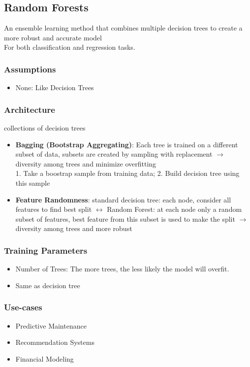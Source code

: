\documentclass[english, threecolumn]{latex4ei/latex4ei_sheet}
\begin{document}
\begin{sectionbox}
\subsection{Random Forests}
An ensemble learning method that combines multiple decision trees to create a more robust and accurate model\\
For both classification and regression tasks.

\subsubsection{Assumptions}
\begin{itemize}
    \item None: Like Decision Trees
\end{itemize}

\subsubsection{Architecture}
collections of decision trees
\begin{itemize}
    \item \textbf{Bagging (Bootstrap Aggregating)}: Each tree is trained on a different subset of data, subsets are created by sampling with replacement $\rightarrow$ diversity among trees and minimize overfitting\\
    1. Take a boostrap sample from training data; 2. Build decision tree using this sample
    \item \textbf{Feature Randomness}: standard decision tree: each node, consider all features to find best split $\leftrightarrow$ Random Forest: at each node only a random subset of features, best feature from this subset is used to make the split $\rightarrow$ diversity among trees and more robust
\end{itemize}

\subsubsection{Training Parameters}
\begin{itemize}
    \item Number of Trees: The more trees, the less likely the model will overfit.
    \item Same as decision tree
\end{itemize}

\subsubsection{Use-cases}
\begin{itemize}
    \item Predictive Maintenance
    \item Recommendation Systems
    \item Financial Modeling
\end{itemize}


\end{sectionbox}
\end{document}
